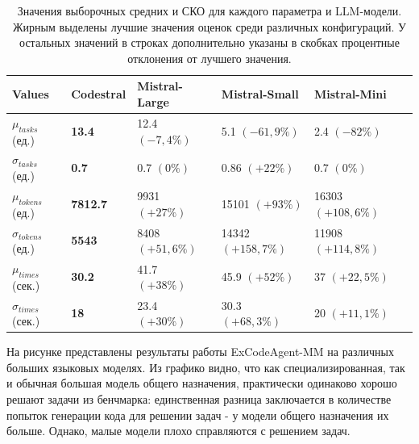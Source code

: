 \begin{table}[t!]%
	\centering\small
	\caption{Значения выборочных средних и СКО для каждого параметра и LLM-модели. 
Жирным выделены лучшие значения оценок среди различных конфигураций. У остальных значений
в строках дополнительно указаны в скобках процентные отклонения от лучшего значения.}%
	\label{tab:ch4:values}		
	\begin{tabular}{|l|l|l|l|l|l|}
		\hline
		Values&Codestral&Mistral-Large&Mistral-Small&Mistral-Mini\\
		\hline
		$\mu_{tasks}$ (ед.)&\textbf{13.4}&12.4 $(-7,4\%)$&5.1 $(-61,9\%)$&2.4 $(-82\%)$\\ \hline
		$\sigma_{tasks}$ (ед.)&\textbf{0.7}&0.7 $(0\%)$&0.86 $(+22\%)$&0.7 $(0\%)$\\ \hline
		$\mu_{tokens}$ (ед.)&\textbf{7812.7}&9931 $(+27\%)$&15101 $(+93\%)$&16303 $(+108,6\%)$\\ \hline
		$\sigma_{tokens}$ (ед.)&\textbf{5543}&8408 $(+51,6\%)$&14342 $(+158,7\%)$&11908 $(+114,8\%)$\\ \hline
		$\mu_{times}$ (сек.)&\textbf{30.2}&41.7 $(+38\%)$&45.9 $(+52\%)$&37 $(+22,5\%)$\\ \hline
		$\sigma_{times}$ (сек.)&\textbf{18}&23.4 $(+30\%)$&30.3 $(+68,3\%)$&20 $(+11,1\%)$\\ \hline		
	\end{tabular}	
	\normalsize%
\end{table}

На рисунке  представлены результаты работы ExCodeAgent-MM на 
различных больших языковых моделях. Из графико видно, что как 
специализированная, так и обычная большая модель общего назначения, практически одинаково 
хорошо решают задачи из бенчмарка: единственная разница заключается в количестве
попыток генерации кода для решении задач - у модели общего назначения их больше. 
Однако, малые модели плохо справляются с решением задач.



